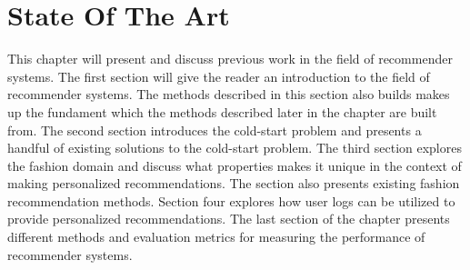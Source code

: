 
\chapter{State Of The Art}
\minitoc
\label{chap:SotA}

This chapter will present and discuss previous work in the field of recommender
systems. The first section will give the reader an introduction to the field of
recommender systems. The methods described in this section also builds makes up the
fundament which the methods described later in the chapter are built from.
The second section introduces the cold-start problem and presents a handful of existing
solutions to the cold-start problem. The third section explores the fashion domain
and discuss what properties makes it unique in the context of making personalized
recommendations. The section also presents existing fashion recommendation methods. 
Section four explores how user logs can be utilized to provide personalized recommendations.
The last section of the chapter presents different methods and evaluation metrics for measuring
the performance of recommender systems.

\clearpage







